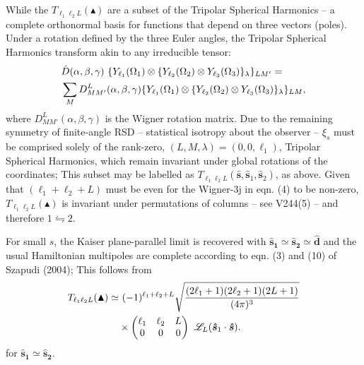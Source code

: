 \documentclass[useAMS,usenatbib]{mn2e}
\newcommand{\tj}[6]{ \begin{pmatrix}
   #1 & #2 & #3 \\
   #4 & #5 & #6 
  \end{pmatrix}}
\begin{document}
While the $T_{\ell_1 \ell_2 L} (\blacktriangle)$ are a subset of the Tripolar Spherical Harmonics -- a complete orthonormal basis for functions that depend on three vectors (poles).  Under a rotation defined by the three Euler angles, the Tripolar Spherical Harmonics transform akin to any irreducible tensor: 
\begin{align}
&\hat D(\alpha, \beta, \gamma)  \ \{ Y_{\ell_1} (\Omega_1) \otimes \{ Y_{\ell_2} (\Omega_2) \otimes Y_{\ell_3} (\Omega_3) \}_\lambda \}_{LM'} =  \notag \\ 
& \sum_{M} D^L_{M M '}(\alpha, \beta, \gamma) \{ Y_{\ell_1} (\Omega_1) \otimes \{ Y_{\ell_2} (\Omega_2) \otimes Y_{\ell_3} (\Omega_3) \}_\lambda \}_{LM},      
\end{align}
where $D^L_{M M '}(\alpha, \beta, \gamma)$ is the Wigner rotation matrix.  Due to the remaining symmetry of finite-angle RSD -- statistical isotropy about the observer -- $\xi_s$ must be comprised solely of the rank-zero, $(L,M, \lambda) = (0,0, \ell_1)$, Tripolar Spherical Harmonics, which remain invariant under global rotations of the coordinates; This subset may be labelled as $T_{\ell_1 \ell_2 L}(\boldsymbol {\hat s}, \boldsymbol {\hat s}_1, \boldsymbol {\hat s}_2)$, as above.  Given that $(\ell_1 + \ell_2 + L)$ must be even for the Wigner-3j in eqn. (4) to be non-zero, $T_{\ell_1 \ell_2 L}(\blacktriangle)$ is invariant under permutations of columns -- see V244(5) -- and therefore $1 \leftrightharpoons 2$. 

For small $s$, the Kaiser plane-parallel limit is recovered with $\boldsymbol {\hat s_1} \simeq \boldsymbol {\hat s_2} \simeq \boldsymbol {\hat d}$ and the usual Hamiltonian multipoles are complete according to eqn. (3) and (10) of Szapudi (2004); This follows from
\begin{align}
T_{\ell_1 \ell_2 L}(\blacktriangle) \simeq & \ (-1)^{\ell_1 + \ell_2 + L} \sqrt{\frac{(2\ell_1 +1)(2\ell_2+1)(2L+1)}{(4 \pi)^3}} \notag \\ 
& \times \tj{\ell_1}{ \ell_2}{L}{0}{0}{0} \  \mathcal{L}_{L}(\boldsymbol {\hat s}_1 \cdot \boldsymbol {\hat s}).
\end{align}
for $\boldsymbol {\hat s_1} \simeq \boldsymbol {\hat s_2}$.
\end{document}
